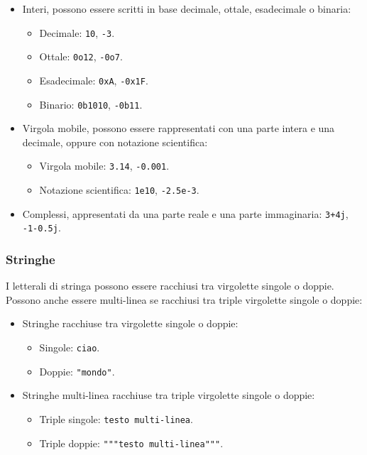 \documentclass[
  letterpaper,
]{scrbook}
\providecommand{\tightlist}{%
  \setlength{\itemsep}{0pt}\setlength{\parskip}{0pt}}\usepackage{longtable,booktabs,array}
\begin{document}
\begin{itemize}
\item
  Interi, possono essere scritti in base decimale, ottale, esadecimale o
  binaria:

  \begin{itemize}
  \tightlist
  \item
    Decimale: \texttt{10}, \texttt{-3}.
  \item
    Ottale: \texttt{0o12}, \texttt{-0o7}.
  \item
    Esadecimale: \texttt{0xA}, \texttt{-0x1F}.
  \item
    Binario: \texttt{0b1010}, \texttt{-0b11}.
  \end{itemize}
\item
  Virgola mobile, possono essere rappresentati con una parte intera e
  una decimale, oppure con notazione scientifica:

  \begin{itemize}
  \tightlist
  \item
    Virgola mobile: \texttt{3.14}, \texttt{-0.001}.
  \item
    Notazione scientifica: \texttt{1e10}, \texttt{-2.5e-3}.
  \end{itemize}
\item
  Complessi, appresentati da una parte reale e una parte immaginaria:
  \texttt{3+4j}, \texttt{-1-0.5j}.
\end{itemize}

\subsubsection{Stringhe}\label{stringhe}

I letterali di stringa possono essere racchiusi tra virgolette singole o
doppie. Possono anche essere multi-linea se racchiusi tra triple
virgolette singole o doppie:

\begin{itemize}
\item
  Stringhe racchiuse tra virgolette singole o doppie:

  \begin{itemize}
  \tightlist
  \item
    Singole: \texttt{\textquotesingle{}ciao\textquotesingle{}}.
  \item
    Doppie: \texttt{"mondo"}.
  \end{itemize}
\item
  Stringhe multi-linea racchiuse tra triple virgolette singole o doppie:

  \begin{itemize}
  \tightlist
  \item
    Triple singole:
    \texttt{\textquotesingle{}\textquotesingle{}\textquotesingle{}testo\ multi-linea\textquotesingle{}\textquotesingle{}\textquotesingle{}}.
  \item
    Triple doppie: \texttt{"""testo\ multi-linea"""}.
  \end{itemize}
\end{itemize}
\end{document}
